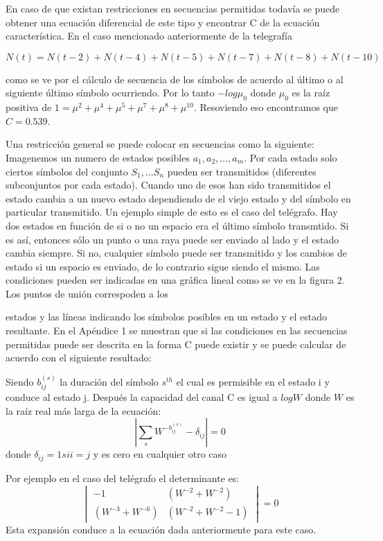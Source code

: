 En caso de que existan restricciones en secuencias permitidas todav\'ia se puede 
obtener una ecuaci\'on diferencial de este tipo y encontrar C de la ecuaci\'on 
caracter\'istica. En el caso mencionado anteriormente de la telegraf\'ia

$N(t) = N(t-2)+N(t-4)+N(t-5)+N(t-7)+N(t-8)+N(t-10)$

como se ve por el c\'alculo de secuencia de los s\'imbolos de acuerdo al \'ultimo o 
al siguiente \'ultimo s\'imbolo ocurriendo.
Por lo tanto $-log\mu_{0}$ donde $\mu_{0}$ es la ra\'iz positiva de 
$1 = \mu^{2}+\mu^{4}+\mu^{5}+\mu^{7}+\mu^{8}+\mu^{10}$. Resoviendo eso encontramos 
que $C = 0.539$.

Una restricci\'on general se puede colocar en secuencias como la siguiente: Imagenemos
un numero de estados posibles $a_{1}, a_{2},...,a_{m}$. Por cada estado solo 
ciertos s\'imbolos del conjunto $S_{1},...S_{n}$ pueden ser transmitidos 
(diferentes subconjuntos por cada estado). Cuando uno de esos han sido transmitidos 
el estado cambia a un nuevo estado dependiendo de el viejo estado y del s\'imbolo en 
particular transmitido. Un ejemplo simple de esto es el caso del tel\'egrafo. Hay 
dos estados en funci\'on de si o no un espacio era el \'ultimo s\'imbolo transmtido. 
Si es as\'i, entonces s\'olo un punto o una raya puede ser enviado al lado y el 
estado cambia siempre. Si no, cualquier s\'imbolo puede ser transmitido y los 
cambios de estado si un espacio es enviado, de lo contrario sigue siendo el mismo. 
Las condiciones pueden ser indicadas en una gr\'afica lineal como se ve en la 
figura 2. Los puntos de uni\'on correspoden a los 


estados y las l\'ineas indicando los s\'imbolos posibles en un estado y el estado resultante. 
En el Ap\'endice 1 se muestran que si las condiciones en las secuencias 
permitidas puede ser descrita en la forma C puede existir y se puede calcular de 
acuerdo con el siguiente resultado:
\begin{theorem} Siendo $b_{ij}^{(s)}$ la duraci\'on del s\'imbolo $s^{th}$ el cual 
es permisible en el estado i y conduce al estado j. Despu\'es la capacidad del canal 
C es igual a $logW$ donde $W$ es la ra\'iz real m\'as larga de la ecuaci\'on:
\begin{equation}
\left|\sum_{s}W^{-b_{ij}^{(s)}}-\delta_{ij}\right|=0
\end{equation}
donde $\delta_{ij}=1 si i=j$ y es cero en cualquier otro caso
\end{theorem}
Por ejemplo en el caso del tel\'egrafo el determinante es:
\begin{equation}
\begin{vmatrix}
-1&(W^{-2}+W^{-2}) \\ 
 (W^{-3}+W^{-6})&(W^{-2}+W^{-2}-1) 
\end{vmatrix}=0
\end{equation}
Esta expansi\'on conduce a la ecuaci\'on dada anteriormente para este caso.

